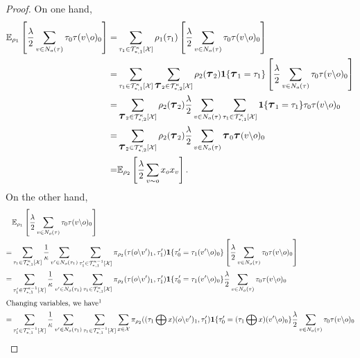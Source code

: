 \documentclass[12pt]{article}
\newcommand{\one}[1]{\mathbf{1}\{#1\}}
\newcommand{\tree}[2]{\mathcal{T}_{*, #1}^{#2}[\mathcal{X}]}
\newcommand{\TB}{{ \boldsymbol{\scalebox{1.2}[1.2]{$\tau$}}}}
\numberwithin{equation}{section}
\begin{document}
\begin{proof}
    On one hand,
    \begin{align*}
        \mathbb{E}_{\rho_1}\left[\frac\lambda2\sum_{v\in N_o(\tau)} \tau_0\tau(v\backslash o)_0\right]
        = & \sum_{\tau_1\in \tree{1}{\kappa}}\rho_1(\tau_1)\left[\frac\lambda2\sum_{v\in N_o(\tau)} \tau_0\tau(v\backslash o)_0\right]                                                  \\
        = & \sum_{\tau_1\in \tree{1}{\kappa}}\sum_{\TB_2\in \tree{2}{\kappa}}\rho_2(\TB_2)\one{\TB_1=\tau_1}\left[\frac\lambda2\sum_{v\in N_o(\tau)} \tau_0\tau(v\backslash o)_0\right] \\
        = & \sum_{\TB_2\in \tree{2}{\kappa}}\rho_2(\TB_2)\frac\lambda2\sum_{v\in N_o(\tau)}\sum_{\tau_1\in \tree{1}{\kappa}}\one{\TB_1=\tau_1} \tau_0\tau(v\backslash o)_0              \\
        = & \sum_{\TB_2\in \tree{2}{\kappa}}\rho_2(\TB_2)\frac\lambda2\sum_{v\in N_o(\tau)}\TB_0\TB(v\backslash o)_0                                                                    \\
        = & \mathbb{E}_{\rho_2}\left[\frac\lambda2\sum_{v\sim o} x_o x_v\right].
    \end{align*}
    On the other hand,
    \begin{align*}
          & \mathbb{E}_{\rho_1}\left[\frac\lambda2\sum_{v\in N_o(\tau)} \tau_0\tau(v\backslash o)_0\right]                                                                                                                                                                                                                \\
        = & \sum_{\tau_1\in \tree{1}{\kappa}}\frac1\kappa\sum_{v'\in N_o(\tau_1)}\sum_{\tau_1'\in\tree{1}{\kappa-1}}\pi_{\rho_2}(\tau(o\backslash v')_1, \tau_1')\one{\tau_0'=\tau_1(v'\backslash o)_0}\left[\frac\lambda2\sum_{v\in N_o(\tau)} \tau_0\tau(v\backslash o)_0\right]                                        \\
        = & \sum_{\tau_1'\in\tree{1}{\kappa-1}}\frac1\kappa\sum_{v'\in N_o(\tau_1)}\sum_{\tau_1\in \tree{1}{\kappa}}\pi_{\rho_2}(\tau(o\backslash v')_1, \tau_1')\one{\tau_0'=\tau_1(v'\backslash o)_0}\frac\lambda2\sum_{v\in N_o(\tau)} \tau_0\tau(v\backslash o)_0                                                     \\
        \intertext{Changing variables, we have\footnotemark}
        = & \sum_{\tau_1'\in\tree{1}{\kappa-1}}\frac1\kappa\sum_{v'\in N_o(\tau_1)}\sum_{\tau_1\in \tree{1}{\kappa-1}}\sum_{x\in\mathcal{X}}\pi_{\rho_2}((\tau_1\bigoplus x)(o\backslash v')_1, \tau_1')\one{\tau_0'=(\tau_1\bigoplus x)(v'\backslash o)_0}\frac\lambda2\sum_{v\in N_o(\tau)} \tau_0\tau(v\backslash o)_0 \\

\end{align*}
\end{proof}
\end{document}
